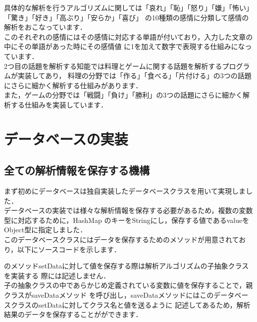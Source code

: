 具体的な解析を行うアルゴリズムに関しては「哀れ」「恥」「怒り」「嫌」「怖い」「驚き」「好き」「高ぶり」「安らか」「喜び」
の10種類の感情に分類して感情の解析をおこなっています．\\

このそれぞれの感情にはその感情に対応する単語が付いており，入力した文章の中にその単語があった時にその感情値
に1を加えて数字で表現する仕組みになっています．\\
2つ目の話題を解析する知能では料理とゲームに関する話題を解析するプログラムが実装してあり，
料理の分野では「作る」「食べる」「片付ける」の3つの話題にさらに細かく解析する仕組みがあります．
\\
また，ゲームの分野では「戦闘」「負け」「勝利」の3つの話題にさらに細かく解析する仕組みを実装しています．
\\


\section{データベースの実装}
\subsection{全ての解析情報を保存する機構}
まず初めにデータベースは独自実装したデータベースクラスを用いて実現しました．\\

データベースの実装では様々な解析情報を保存する必要があるため，複数の変数型に対応するために，HashMap
のキーをStringにし，保存する値であるvalueをObject型に指定しました．\\

このデータベースクラスにはデータを保存するためのメソッドが用意されており，以下にソースコードを示します．\\


のメソッドsetDataに対して値を保存する際は解析アルゴリズムの子抽象クラスを実装する
際には記述しません．\\
子の抽象クラスの中であらかじめ定義されている変数に値を保存することで，親クラスがsaveDataメソッド
を呼び出し，saveDataメソッドにはこのデータベースクラスのsetDataに対してクラス名と値を送るように
記述してあるため，解析結果のデータを保存することがができます．\\

